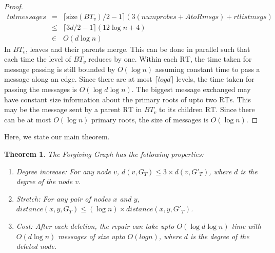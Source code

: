 \documentclass[11pt, letter]{article}
\newtheorem{theorem}{Theorem}
\newcommand{\RT}{\mathrm{RT}}
\newcommand{\size}{\mathrm{size}}
\begin{document}
\begin{proof}
\begin{eqnarray*}
totmessages & = & \lceil \size(BT_{v})/2 - 1 \rceil( 3 ( numprobes  + AtoRmsgs) + rtlistmsgs )\\
 & \le & \lceil 3d/2 - 1 \rceil ( 12 \log n + 4 )\\
 & \in & O(d \log n)
\end{eqnarray*}
 In $BT_{v}$, leaves and their parents merge. This can be done in parallel such that each time the level of $BT_{v}$
reduces by one. Within each $\RT$, the time taken for message passing is still bounded by $O(\log n)$
assuming constant time to pass a message along an edge. Since there are at most $\lceil log d \rceil$ levels, the time
taken for passing the messages is $O(\log d \log n)$. The biggest message exchanged may have constant size information
about the primary roots of upto two $\RT$s. This may be the message sent by a parent $\RT$ in $BT_{v}$ to its children
$\RT$. Since there can be at most $O(\log n)$ primary roots, the size of messages is $O(\log n)$.
\end{proof}

Here, we state our main theorem. 
 


\begin{theorem}
 
The Forgiving Graph has the following properties:
\label{theorem: forgiving}
\begin{enumerate}
\item\label{th: degree} 
 \emph{Degree increase:} For any node $v$, $d(v,G_{T}) \le 3 \times d(v,G'_{T})$, where $d$ is the degree of the node $v$. 
\item\label{th: stretch} 
\emph{Stretch:} For any pair of nodes $x$ and $y$, $distance(x,y, G_{T}) \le (\log n) \times distance(x,y,G'_{T})$.
\item \label{th: cost}  \emph{Cost:} After each deletion, the repair can take upto $O(\log d\log n)$ time with $O(d \log
n)$ messages of size upto $O(log n)$, where $d$ is the degree of the deleted node.
\end{enumerate}
\end{theorem}
\end{document}
